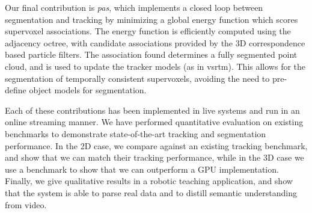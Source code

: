 Our final contribution is \emph{\gls{pas}}, which implements a closed loop between segmentation and tracking by minimizing a global energy function which scores supervoxel associations. The energy function is efficiently computed using the adjacency octree, with candidate associations provided by the 3D correspondence based particle filters. The association found determines a fully segmented point cloud, and is used to update the tracker models (as in \gls{vsrtm}). This allows for the segmentation of temporally consistent supervoxels, avoiding the need to pre-define object models for segmentation. 

Each of these contributions has been implemented in live systems and run in an online streaming manner. We have performed quantitative evaluation on existing benchmarks to demonstrate state-of-the-art tracking and segmentation performance. In the 2D case, we compare against an existing tracking benchmark, and show that we can match their tracking performance, while in the 3D case we use a benchmark to show that we can outperform a GPU implementation. Finally, we give qualitative results in a robotic teaching application, and show that the system is able to parse real data and to distill semantic understanding from video.